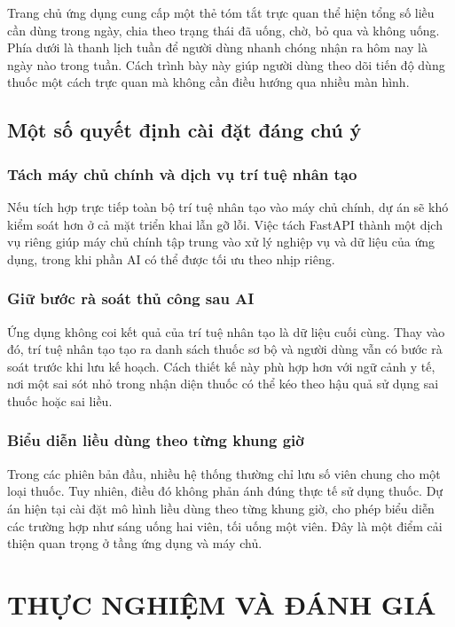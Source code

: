 \documentclass[12pt,a4paper]{report}
\begin{document}
Trang chủ ứng dụng cung cấp một thẻ tóm tắt trực quan thể hiện tổng số liều cần dùng trong ngày, chia theo trạng thái đã uống, chờ, bỏ qua và không uống. Phía dưới là thanh lịch tuần để người dùng nhanh chóng nhận ra hôm nay là ngày nào trong tuần. Cách trình bày này giúp người dùng theo dõi tiến độ dùng thuốc một cách trực quan mà không cần điều hướng qua nhiều màn hình.

\section{Một số quyết định cài đặt đáng chú ý}

\subsection{Tách máy chủ chính và dịch vụ trí tuệ nhân tạo}

Nếu tích hợp trực tiếp toàn bộ trí tuệ nhân tạo vào máy chủ chính, dự án sẽ khó kiểm soát hơn ở cả mặt triển khai lẫn gỡ lỗi. Việc tách FastAPI thành một dịch vụ riêng giúp máy chủ chính tập trung vào xử lý nghiệp vụ và dữ liệu của ứng dụng, trong khi phần AI có thể được tối ưu theo nhịp riêng.

\subsection{Giữ bước rà soát thủ công sau AI}

Ứng dụng không coi kết quả của trí tuệ nhân tạo là dữ liệu cuối cùng. Thay vào đó, trí tuệ nhân tạo tạo ra danh sách thuốc sơ bộ và người dùng vẫn có bước rà soát trước khi lưu kế hoạch. Cách thiết kế này phù hợp hơn với ngữ cảnh y tế, nơi một sai sót nhỏ trong nhận diện thuốc có thể kéo theo hậu quả sử dụng sai thuốc hoặc sai liều.

\subsection{Biểu diễn liều dùng theo từng khung giờ}

Trong các phiên bản đầu, nhiều hệ thống thường chỉ lưu số viên chung cho một loại thuốc. Tuy nhiên, điều đó không phản ánh đúng thực tế sử dụng thuốc. Dự án hiện tại cài đặt mô hình liều dùng theo từng khung giờ, cho phép biểu diễn các trường hợp như sáng uống hai viên, tối uống một viên. Đây là một điểm cải thiện quan trọng ở tầng ứng dụng và máy chủ.

\chapter{THỰC NGHIỆM VÀ ĐÁNH GIÁ}
\end{document}
